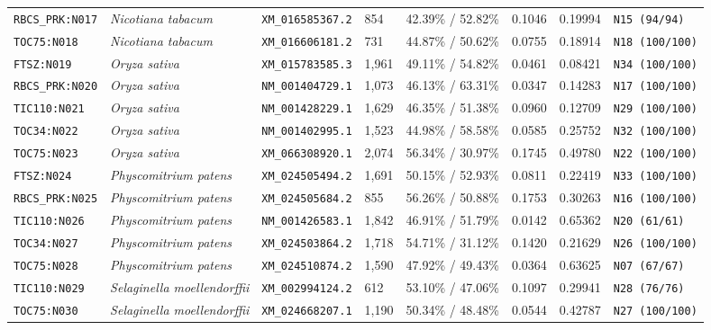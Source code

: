 \documentclass[10pt,letterpaper]{article}
\begin{document}
\begin{longtable}{llllllll}
\texttt{RBCS\_PRK:N017} & \textit{Nicotiana tabacum} & \texttt{XM\_016585367.2} & 854 & 42.39\% / 52.82\% & 0.1046 & 0.19994 & \texttt{N15 (94/94)} \\
\texttt{TOC75:N018} & \textit{Nicotiana tabacum} & \texttt{XM\_016606181.2} & 731 & 44.87\% / 50.62\% & 0.0755 & 0.18914 & \texttt{N18 (100/100)} \\
\texttt{FTSZ:N019} & \textit{Oryza sativa} & \texttt{XM\_015783585.3} & 1,961 & 49.11\% / 54.82\% & 0.0461 & 0.08421 & \texttt{N34 (100/100)} \\
\texttt{RBCS\_PRK:N020} & \textit{Oryza sativa} & \texttt{NM\_001404729.1} & 1,073 & 46.13\% / 63.31\% & 0.0347 & 0.14283 & \texttt{N17 (100/100)} \\
\texttt{TIC110:N021} & \textit{Oryza sativa} & \texttt{NM\_001428229.1} & 1,629 & 46.35\% / 51.38\% & 0.0960 & 0.12709 & \texttt{N29 (100/100)} \\
\texttt{TOC34:N022} & \textit{Oryza sativa} & \texttt{NM\_001402995.1} & 1,523 & 44.98\% / 58.58\% & 0.0585 & 0.25752 & \texttt{N32 (100/100)} \\
\texttt{TOC75:N023} & \textit{Oryza sativa} & \texttt{XM\_066308920.1} & 2,074 & 56.34\% / 30.97\% & 0.1745 & 0.49780 & \texttt{N22 (100/100)} \\
\texttt{FTSZ:N024} & \textit{Physcomitrium patens} & \texttt{XM\_024505494.2} & 1,691 & 50.15\% / 52.93\% & 0.0811 & 0.22419 & \texttt{N33 (100/100)} \\
\texttt{RBCS\_PRK:N025} & \textit{Physcomitrium patens} & \texttt{XM\_024505684.2} & 855 & 56.26\% / 50.88\% & 0.1753 & 0.30263 & \texttt{N16 (100/100)} \\
\texttt{TIC110:N026} & \textit{Physcomitrium patens} & \texttt{NM\_001426583.1} & 1,842 & 46.91\% / 51.79\% & 0.0142 & 0.65362 & \texttt{N20 (61/61)} \\
\texttt{TOC34:N027} & \textit{Physcomitrium patens} & \texttt{XM\_024503864.2} & 1,718 & 54.71\% / 31.12\% & 0.1420 & 0.21629 & \texttt{N26 (100/100)} \\
\texttt{TOC75:N028} & \textit{Physcomitrium patens} & \texttt{XM\_024510874.2} & 1,590 & 47.92\% / 49.43\% & 0.0364 & 0.63625 & \texttt{N07 (67/67)} \\
\texttt{TIC110:N029} & \textit{Selaginella moellendorffii} & \texttt{XM\_002994124.2} & 612 & 53.10\% / 47.06\% & 0.1097 & 0.29941 & \texttt{N28 (76/76)} \\
\texttt{TOC75:N030} & \textit{Selaginella moellendorffii} & \texttt{XM\_024668207.1} & 1,190 & 50.34\% / 48.48\% & 0.0544 & 0.42787 & \texttt{N27 (100/100)} \\

\end{longtable}
\end{document}
